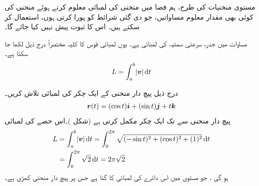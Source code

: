 مستوی منحنیات کی طرح، ہم فضا میں منحنی کی لمبائی معلوم کرتے ہوئے منحنی کی کوئی بھی مقدار معلوم مساواتیں، جو دی گئی شرائط کو پورا کرتی ہوں، استعمال کر سکتے ہیں۔ اس کا ثبوت پیش نہیں کیا جائے گا۔

مساوات  میں جذر، سرعتی سمتیہ  کی لمبائی   ہے۔ یوں لمبائی قوس کا کلیہ مختصراً درج ذیل لکھا جا سکتا ہے۔
\begin{align}\label{مساوات_سمتی_تفاعل_لمبائی_قوس_ب}
L=\int_a^b\abs{\kvec{v}}\dif t
\end{align}


درج ذیل پیچ دار منحنی کے ایک چکر کی لمبائی تلاش کریں۔
\begin{align*}
{\ensuremath{{\boldsymbol{r}}}}(t)=(\cos t){\boldsymbol{i}}+(\sin t){\boldsymbol{j}}+t{\boldsymbol{k}}
\end{align*}
پیچ دار منحنی  سے  تک ایک چکر مکمل کرتی ہے (شکل )۔اس حصے  کی لمبائی
\begin{align*}
L&=\int_a^b\abs{\kvec{v}}\dif t=\int_0^{2\pi}\sqrt{(-\sin t)^2+(\cos t)^2+(1)^2}\dif t\\
&=\int_0^{2\pi}\sqrt{2}\dif t=2\pi\sqrt{2}
\end{align*}
ہو گی ، جو مستوی  میں اس دائرے کی لمبائی کا  گنا ہے جس پر پیچ دار منحنی کھڑی ہے۔
